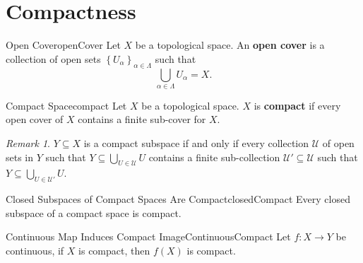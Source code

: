\documentclass[math]{amznotes}
\theoremstyle{remark}
\newtheorem*{remark}{Remark}
\begin{document}
\section{Compactness}
\begin{dfnbox}{Open Cover}{openCover}
    Let $X$ be a topological space. An {\color{red} \textbf{open cover}} is a collection of open sets $\left\{U_{\alpha}\right\}_{\alpha \in \Lambda}$ such that 
    \begin{equation*}
        \bigcup_{\alpha \in \Lambda}U_{\alpha} = X.
    \end{equation*}
\end{dfnbox}
\begin{dfnbox}{Compact Space}{compact}
    Let $X$ be a topological space. $X$ is {\color{red} \textbf{compact}} if every open cover of $X$ contains a finite sub-cover for $X$.
\end{dfnbox}
\begin{notebox}
    \begin{remark}
        $Y \subseteq X$ is a compact subspace if and only if every collection $\mathcal{U}$ of open sets in $Y$ such that $Y \subseteq \bigcup_{U \in \mathcal{U}}U$ contains a finite sub-collection $\mathcal{U}' \subseteq \mathcal{U}$ such that $Y \subseteq \bigcup_{U \in \mathcal{U}'}U$.
    \end{remark}
\end{notebox}
\begin{probox}{Closed Subspaces of Compact Spaces Are Compact}{closedCompact}
    Every closed subspace of a compact space is compact.
\end{probox}
\begin{probox}{Continuous Map Induces Compact Image}{ContinuousCompact}
    Let $f \colon X \to Y$ be continuous, if $X$ is compact, then $f\left(X\right)$ is compact.
\end{probox}
\end{document}
